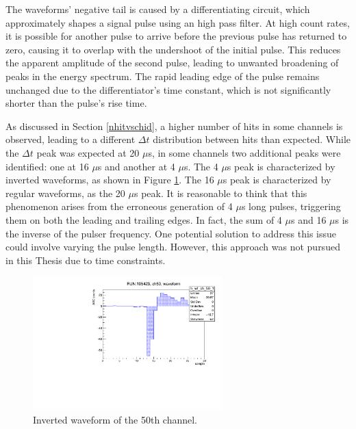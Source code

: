 The waveforms' negative tail is caused by a differentiating circuit, which approximately shapes a signal pulse using an high pass filter. 
At high count rates, it is possible for another pulse to arrive before the previous pulse has returned to zero, causing it to overlap with the undershoot of the initial pulse. 
This reduces the apparent amplitude of the second pulse, leading to unwanted broadening of peaks in the energy spectrum. 
The rapid leading edge of the pulse remains unchanged due to the differentiator's time constant, which is not significantly 
shorter than the pulse's rise time. 



As discussed in Section \ref{nhitvschid}, a higher number of hits in some channels is observed, 
leading to a different $\Delta t$ distribution between hits than expected. 
While the $\Delta t$ peak was expected at 20 $\mu$s, in some channels two additional peaks were identified: 
one at 16 $\mu$s and another at 4 $\mu$s. The 4 $\mu$s peak is characterized by inverted waveforms, as shown in Figure \ref{fig:inverted}. 
The 16 $\mu$s peak is characterized by regular waveforms, as the 20 $\mu$s peak.
It is reasonable to think that this phenomenon arises from the erroneous generation of 4 $\mu$s long pulses, 
triggering them on both the leading and trailing edges. In fact, the sum of 4 $\mu$s and 16 $\mu$s is the inverse of the pulser frequency. 
One potential solution to address this issue could involve varying the pulse length. 
However, this approach was not pursued in this Thesis due to time constraints.
\begin{figure}[!h]
  \centering
  \includegraphics[width=0.65\textwidth]{figures/pdf/wf_ch50_1.pdf}
  \caption{Inverted waveform of the 50th channel.}
 \label{fig:inverted}
\end{figure}
